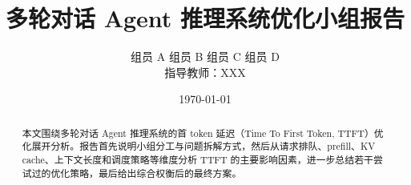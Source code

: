 \documentclass[UTF8,a4paper,12pt,fontset=fandol]{ctexart}
\title{\textbf{多轮对话 Agent 推理系统优化小组报告}}
\author{
  组员 A \quad 组员 B \quad 组员 C \quad 组员 D\\
  \small 指导教师：XXX
}
\date{\today}
\begin{document}
\maketitle

\begin{abstract}
本文围绕多轮对话 Agent 推理系统的首 token 延迟（Time To First Token, TTFT）优化展开分析。报告首先说明小组分工与问题拆解方式，然后从请求排队、prefill、KV cache、上下文长度和调度策略等维度分析 TTFT 的主要影响因素，进一步总结若干尝试过的优化策略，最后给出综合权衡后的最终方案。
\end{abstract}

\tableofcontents
\newpage











\end{document}
